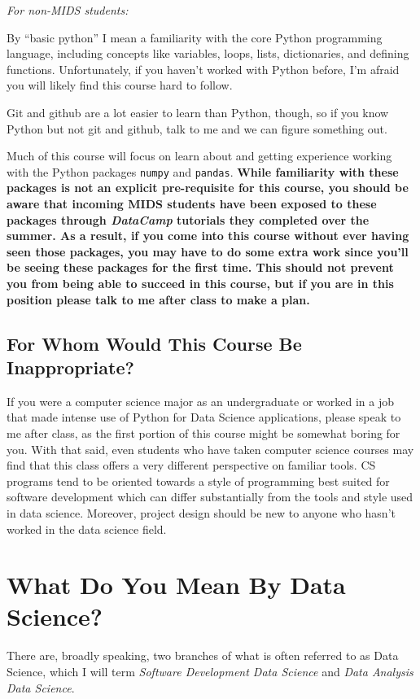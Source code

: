 \documentclass[12pt]{article}
\begin{document}
\emph{For non-MIDS students:}

By ``basic python'' I mean a familiarity with the core Python programming language, including concepts like variables, loops, lists, dictionaries, and defining functions. Unfortunately, if you haven't worked with Python before, I'm afraid you will likely find this course hard to follow.

Git and github are a lot easier to learn than Python, though, so if you know Python but not git and github, talk to me and we can figure something out.

Much of this course will focus on learn about and getting experience working with the Python packages \texttt{numpy} and \texttt{pandas}. \textbf{While familiarity with these packages is not an explicit pre-requisite for this course, you should be aware that incoming MIDS students have been exposed to these packages through \emph{DataCamp} tutorials they completed over the summer. As a result, if you come into this course without ever having seen those packages, you may have to do some extra work since you'll be seeing these packages for the first time. This should not prevent you from being able to succeed in this course, but if you are in this position please talk to me after class to make a plan.}

\subsection{For Whom Would This Course Be Inappropriate?}

If you were a computer science major as an undergraduate or worked in a job that made intense use of Python for Data Science applications, please speak to me after class, as the first portion of this course might be somewhat boring for you. With that said, even students who have taken computer science courses may find that this class offers a very different perspective on familiar tools. CS programs tend to be oriented towards a style of programming best suited for software development which can differ substantially from the tools and style used in data science. Moreover, project design should be new to anyone who hasn't worked in the data science field.

\section{What Do You Mean By Data Science?}

There are, broadly speaking, two branches of what is often referred to as Data Science, which I will term \emph{Software Development Data Science} and \emph{Data Analysis Data Science}.
\end{document}
